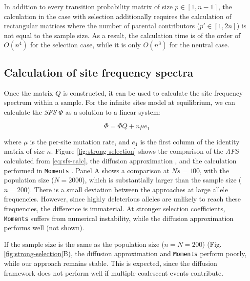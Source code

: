 \documentclass[review]{elsarticle}
\begin{document}
In addition to every transition probability matrix of size $p \in [1, n-1]$, the calculation in the
case with selection additionally requires the calculation of rectangular matrices where the number
of parental contributors ($p' \in [1, 2n]$) is not equal to the sample size. As a result, the
calculation time is of the order of $O(n^4)$ for the selection case, while it is only $O(n^3)$ for
the neutral case.

\subsection{Calculation of site frequency spectra}
\label{subsec:afs}

Once the matrix $Q$ is constructed, it can be used to calculate the site frequency spectrum within a
sample. For the infinite sites model at equilibrium, we can calculate the \textit{SFS} $\Phi$ as a
solution to a linear system:

\begin{equation}
  \label{eq:sfs-calc}
\Phi = \Phi Q + n \mu e_1
\end{equation}

where $\mu$ is the per-site mutation rate, and $e_1$ is the first column of the identity matrix of
size $n$. Figure \ref{fig:strong-selection} shows the comparison of the \textit{AFS} calculated from
\eqref{eq:sfs-calc}, the diffusion approximation \cite[eq. 9.23]{Ewens2004}, and the calculation
performed in \texttt{Moments} \cite{JouganousEtAl2017}. Panel A shows a comparison at $Ns=100$, with
the population size ($N=2000$), which is substantially larger than the sample size ($n=200$). There
is a small deviation between the approaches at large allele frequencies. However, since highly
deleterious alleles are unlikely to reach these frequencies, the difference is immaterial. At
stronger selection coefficients, \texttt{Moments} suffers from numerical instability, while the
diffusion approximation performs well (not shown).

If the sample size is the same as the population size ($n=N=200$) (Fig.
\ref{fig:strong-selection}B), the diffusion approximation and \texttt{Moments} perform poorly, while
our approach remains stable. This is expected, since the diffusion framework does not perform well
if multiple coalescent events contribute.
\end{document}
